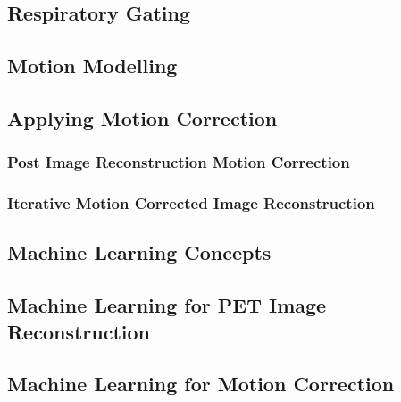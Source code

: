         \subsection{Respiratory Gating} \label{respiratory_gating}
            \blindtext
            
        \subsection{Motion Modelling} \label{motion_modelling}
            \blindtext
        
        \subsection{Applying Motion Correction} \label{applying_motion_correction}
            \blindtext
            
            \subsubsection{Post Image Reconstruction Motion Correction} \label{post_image_reconstruction_motion_correction}
                \blindtext
                
            \subsubsection{Iterative Motion Corrected Image Reconstruction} \label{iterative_motion_corrected_image_reconstruction}
                \blindtext
    
        \blindtext
        
        \subsection{Machine Learning Concepts} \label{machine_learning_concepts}
            \blindtext
        
        \subsection{Machine Learning for PET Image Reconstruction} \label{machine_learning_for_pet_image_reconstruction}
            \blindtext
        
        \subsection{Machine Learning for Motion Correction} \label{machine_learning_for_motion_correction}
            \blindtext
